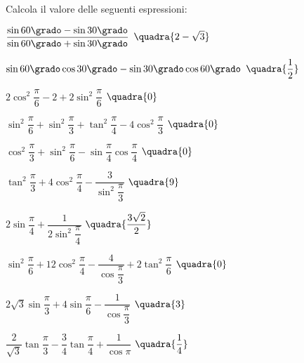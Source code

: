 \subsubsection*{}

\begin{esercizio}\label{ese:03.1}
Calcola il valore delle seguenti espressioni:
\begin{multicols}{2}
 \begin{enumeratea}
  \item  $\dfrac{\sin 60 \grado -\sin 30 \grado}
                {\sin 60 \grado +\sin 30 \grado} $
   \hfill $\quadra{2-\sqrt{3}}$
  \item  $\sin 60 \grado \cos 30 \grado - \sin 30 \grado \cos 60 \grado $
   \hfill $\quadra{\dfrac{1}{2}}$
  \item  $2 \cos^2 \dfrac{\pi}{6} - 2 + 2 \sin^2 \dfrac{\pi}{6}$
   \hfill $\quadra{0}$
  \item  $\sin^2 \dfrac{\pi}{6} + \sin^2 \dfrac{\pi}{3} + 
          \tan^2 \dfrac{\pi}{4} - 4 \cos^2 \dfrac{\pi}{3}$
   \hfill $\quadra{0}$
  \item  $\cos^2 \dfrac{\pi}{3} + \sin^2 \dfrac{\pi}{6} - 
          \sin \dfrac{\pi}{4} \cos \dfrac{\pi}{4}$
   \hfill $\quadra{0}$
  \item  $\tan^2 \dfrac{\pi}{3} + 4 \cos^2 \dfrac{\pi}{4} - 
          \dfrac{3}{\sin^2 \dfrac{\pi}{3}}$
   \hfill $\quadra{9}$
  \item  $2 \sin \dfrac{\pi}{4} + \dfrac{1}{2 \sin^2 \dfrac{\pi}{4}}$
   \hfill $\quadra{\dfrac{3 \sqrt{2}}{2}}$
  \item  $\sin^2 \dfrac{\pi}{6} + 12 \cos^2 \dfrac{\pi}{4} - 
          \dfrac{4}{\cos \dfrac{\pi}{3}} + 2 \tan^2 \dfrac{\pi}{6}$
   \hfill $\quadra{0}$
  \item  $2 \sqrt{3} \sin \dfrac{\pi}{3} +4 \sin \dfrac{\pi}{6} - 
          \dfrac{1}{\cos \dfrac{\pi}{3}}$
   \hfill $\quadra{3}$
  \item  $\dfrac{2}{\sqrt{3}} \tan \dfrac{\pi}{3} -
          \dfrac{3}{4} \tan \dfrac{\pi}{4} + 
          \dfrac{1}{\cos \pi} $
   \hfill $\quadra{\dfrac{1}{4}}$
 \end{enumeratea}
 \end{multicols}
\end{esercizio}

